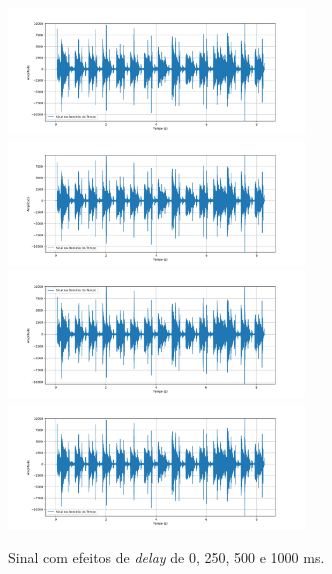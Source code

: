 \begin{figure}[h]
    \centering
    \includegraphics[width=0.7\textwidth]{figuras/fig74.png}
    \includegraphics[width=0.7\textwidth]{figuras/fig75.png}
    \includegraphics[width=0.7\textwidth]{figuras/fig76.png}
    \includegraphics[width=0.7\textwidth]{figuras/fig77.png}
    \caption{Sinal com efeitos de \textit{delay} de 0, 250, 500 e 1000 ms.}
    \label{fig74}
\end{figure}



